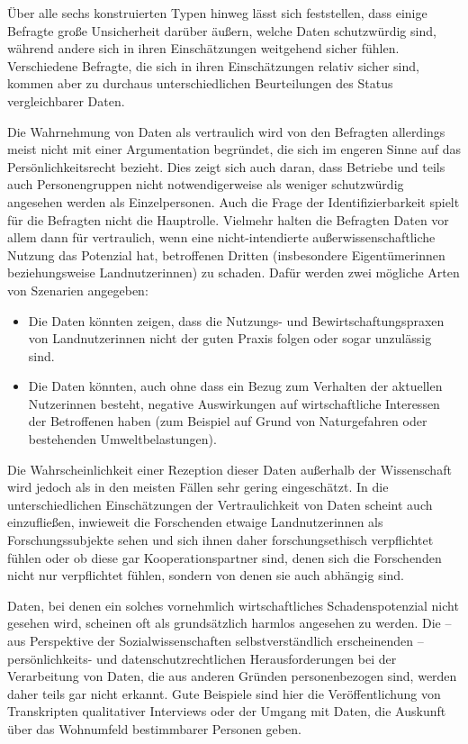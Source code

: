 \documentclass[a4paper,
fontsize=11pt,
oneside,
numbers=noperiodatend,
parskip=half-,
bibliography=totoc,
final
]{scrartcl}
\begin{document}
Über alle sechs konstruierten Typen hinweg lässt sich feststellen, dass
einige Befragte große Unsicherheit darüber äußern, welche Daten
schutzwürdig sind, während andere sich in ihren Einschätzungen
weitgehend sicher fühlen. Verschiedene Befragte, die sich in ihren
Einschätzungen relativ sicher sind, kommen aber zu durchaus
unterschiedlichen Beurteilungen des Status vergleichbarer Daten.

Die Wahrnehmung von Daten als vertraulich wird von den Befragten
allerdings meist nicht mit einer Argumentation begründet, die sich im
engeren Sinne auf das Persönlichkeitsrecht bezieht. Dies zeigt sich auch
daran, dass Betriebe und teils auch Personengruppen nicht
notwendigerweise als weniger schutzwürdig angesehen werden als
Einzelpersonen. Auch die Frage der Identifizierbarkeit spielt für die
Befragten nicht die Hauptrolle. Vielmehr halten die Befragten Daten vor
allem dann für vertraulich, wenn eine nicht-intendierte
außerwissenschaftliche Nutzung das Potenzial hat, betroffenen Dritten
(insbesondere Eigentümerinnen beziehungsweise Landnutzerinnen) zu
schaden. Dafür werden zwei mögliche Arten von Szenarien angegeben:

\begin{itemize}
\item
  Die Daten könnten zeigen, dass die Nutzungs- und
  Bewirtschaftungspraxen von Landnutzerinnen nicht der guten Praxis
  folgen oder sogar unzulässig sind.
\item
  Die Daten könnten, auch ohne dass ein Bezug zum Verhalten der
  aktuellen Nutzerinnen besteht, negative Auswirkungen auf
  wirtschaftliche Interessen der Betroffenen haben (zum Beispiel auf
  Grund von Naturgefahren oder bestehenden Umweltbelastungen).
\end{itemize}

Die Wahrscheinlichkeit einer Rezeption dieser Daten außerhalb der
Wissenschaft wird jedoch als in den meisten Fällen sehr gering
eingeschätzt. In die unterschiedlichen Einschätzungen der
Vertraulichkeit von Daten scheint auch einzufließen, inwieweit die
Forschenden etwaige Landnutzerinnen als Forschungssubjekte sehen und
sich ihnen daher forschungsethisch verpflichtet fühlen oder ob diese gar
Kooperationspartner sind, denen sich die Forschenden nicht nur
verpflichtet fühlen, sondern von denen sie auch abhängig sind.

Daten, bei denen ein solches vornehmlich wirtschaftliches
Schadenspotenzial nicht gesehen wird, scheinen oft als grundsätzlich
harmlos angesehen zu werden. Die -- aus Perspektive der
Sozialwissenschaften selbstverständlich erscheinenden --
persönlichkeits- und datenschutzrechtlichen Herausforderungen bei der
Verarbeitung von Daten, die aus anderen Gründen personenbezogen sind,
werden daher teils gar nicht erkannt. Gute Beispiele sind hier die
Veröffentlichung von Transkripten qualitativer Interviews oder der
Umgang mit Daten, die Auskunft über das Wohnumfeld bestimmbarer Personen
geben.
\end{document}
